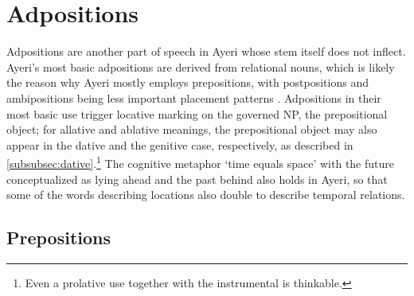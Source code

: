 

\section{Adpositions}
\label{sec:adpositions}

Adpositions are another part of speech in Ayeri whose stem itself does not 
inflect. Ayeri's most basic adpositions are derived from relational nouns, 
which is likely the reason why Ayeri mostly employs prepositions, with 
postpositions and ambipositions being less important placement patterns 
\parencites[110--111]{hagege2010}[81\psqq]{lehmann2015}. Adpositions in their 
most basic use trigger locative marking on the governed NP, the prepositional
object; for allative and ablative meanings, the prepositional object may also
appear in the dative and the genitive case, respectively, as described in
\autoref{subsubsec:dative}.\footnote{Even a prolative use together with the
instrumental is thinkable.} The cognitive metaphor `time equals space' with the
future conceptualized as lying ahead and the past behind also holds in Ayeri,
so that some of the words describing locations also double to describe temporal
relations.

\subsection{Prepositions}
\label{subsec:prepositions}

